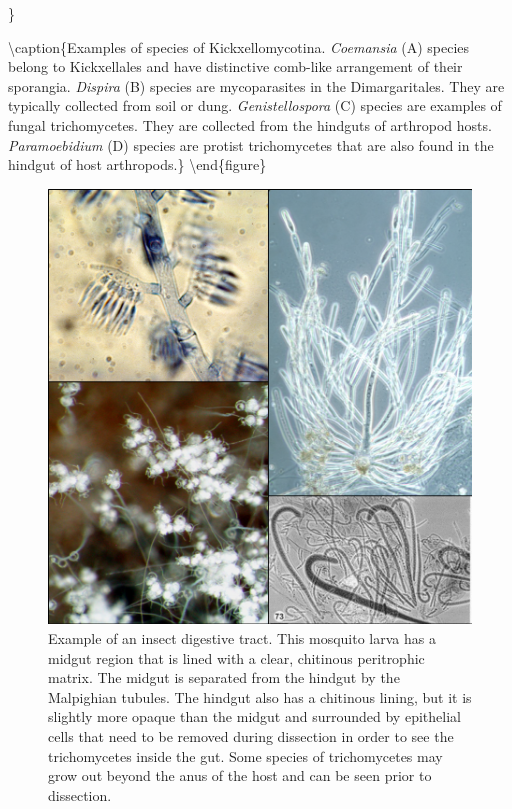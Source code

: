 \documentclass[]{book}
\begin{document}
\}

\textbackslash caption\{Examples of species of Kickxellomycotina. \emph{Coemansia} (A) species belong to Kickxellales and have distinctive comb-like arrangement of their sporangia. \emph{Dispira} (B) species are mycoparasites in the Dimargaritales. They are typically collected from soil or dung. \emph{Genistellospora} (C) species are examples of fungal trichomycetes. They are collected from the hindguts of arthropod hosts. \emph{Paramoebidium} (D) species are protist trichomycetes that are also found in the hindgut of host arthropods.\}\label{fig:ch4fig1}
\textbackslash end\{figure\}

\begin{figure}

{\centering \includegraphics[width=12.08in]{img/Ch4_Fig1} 

}

\caption{Example of an insect digestive tract.  This mosquito larva has a midgut region that is lined with a clear, chitinous peritrophic matrix.  The midgut is separated from the hindgut by the Malpighian tubules.  The hindgut also has a chitinous lining, but it is slightly more opaque than the midgut and surrounded by epithelial cells that need to be removed during dissection in order to see the trichomycetes inside the gut.  Some species of trichomycetes may grow out beyond the anus of the host and can be seen prior to dissection.}\label{fig:ch4fig2}
\end{figure}
\end{document}
